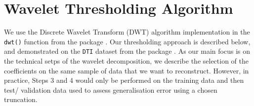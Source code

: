 \section{Wavelet Thresholding Algorithm}\label{sec:wavelet-thresholding-algorithm}

We use the Discrete Wavelet Transform (DWT) algorithm implementation in the \texttt{dwt()} function from the   package \parencite{whitcher_waveslim_2024}.
Our thresholding approach is described below, and demonstrated on the \texttt{DTI} dataset from the   package \parencite{goldsmith_refund_2020}.
As our main focus is on the technical setps of the wavelet decomposition, we describe the selection of the coefficients on the same sample of data that we want to reconstruct. However, in practice, Steps 3 and 4 would only be performed on the training data and then test/ validation data used to assess generalisation error using a chosen truncation.

